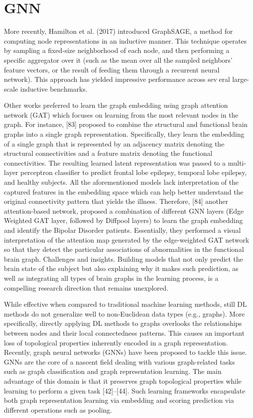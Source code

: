 \section{GNN}

More recently, Hamilton et al. (2017) introduced GraphSAGE,
a method for computing node representations in an inductive manner. This technique operates by
sampling a fixed-size neighborhood of each node, and then performing a specific aggregator over
it (such as the mean over all the sampled neighbors’ feature vectors, or the result of feeding them
through a recurrent neural network). This approach has yielded impressive performance across several large-scale inductive benchmarks.
\cite{Velickovic2018}



Other
works preferred to learn the graph embedding using graph
attention network (GAT) which focuses on learning from
the most relevant nodes in the graph. For instance, [83]
proposed to combine the structural and functional brain
graphs into a single graph representation. Specifically, they
learn the embedding of a single graph that is represented by
an adjacency matrix denoting the structural connectivities
and a feature matrix denoting the functional connectivities.
The resulting learned latent representation was passed to
a multi-layer perceptron classifier to predict frontal lobe
epilepsy, temporal lobe epilepsy, and healthy subjects. All
the aforementioned models lack interpretation of the captured features in 
the embedding space which can help better
understand the original connectivity pattern that yields
the illness. Therefore, [84] another attention-based network,
proposed a combination of different GNN layers (Edge Weighted GAT layer, 
followed by Diffpool layers) to learn
the graph embedding and identify the Bipolar Disorder patients. Essentially, they performed a visual interpretation
of the attention map generated by the edge-weighted GAT
network so that they detect the particular associations of
abnormalities in the functional brain graph.
Challenges and insights. Building models that not only
predict the brain state of the subject but also explaining why
it makes such prediction, as well as integrating all types
of brain graphs in the learning process, is a compelling
research direction that remains unexplored.
\cite{Bessadok2022}


While effective when
compared to traditional machine learning methods, still
DL methods do not generalize well to non-Euclidean data
types (e.g., graphs). More specifically, directly applying DL
methods to graphs overlooks the relationships between
nodes and their local connectedness patterns. This causes an
important loss of topological properties inherently encoded
in a graph representation.
Recently, graph neural networks (GNNs) have been
proposed to tackle this issue. GNNs are the core of a
nascent field dealing with various graph-related tasks such
as graph classification and graph representation learning.
The main advantage of this domain is that it preserves graph topological properties 
while learning to perform a given task [42]–[44].
Such learning frameworks encapsulate both
graph representation learning via embedding and scoring
prediction via different operations such as pooling.

